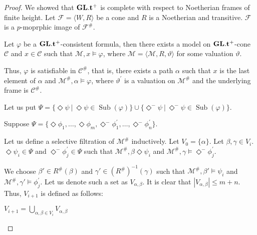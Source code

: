 \documentclass[a4paper]{article}
\theoremstyle{defin}
\theoremstyle{theorem}
\theoremstyle{prop}
\theoremstyle{lemma}
\theoremstyle{ex}
\theoremstyle{col}
\newcommand{\DiamondM}{\Diamond^{-}}
\begin{document}
\begin{proof}
  We showed that ${\bf GL}.{\bf t}^{+}$ is complete with respect to Noetherian frames of finite height. Let $\mathcal{F} = \langle W, R \rangle$ be a cone and $R$ is a Noetherian and transitive. $\mathcal{F}$ is a $p$-moprphic image of $\mathcal{F}^{\#}$.

Let $\varphi$ be a ${\bf GL}.{\bf t}^{+}$-consistent formula, then there exists a model on ${\bf GL}.{\bf t}^{+}$-cone $\mathcal{C}$ and $x \in \mathcal{C}$ such that $\mathcal{M}, x \models \varphi$, where $\mathcal{M} = \langle \mathcal{M}, R, \vartheta \rangle$ for some valuation $\vartheta$.

Thus, $\varphi$ is satisfiable in $\mathcal{C}^{\#}$, that is, there exists a path $\alpha$ such that $x$ is the last element of $\alpha$ and $\mathcal{M}^{\#}, \alpha \models \varphi$, where $\vartheta^{'}$ is a valuation on $\mathcal{M}^{\#}$ and the underlying frame is $\mathcal{C}^{\#}$.

Let us put $\Psi = \{ \Diamond \psi \: | \: \Diamond \psi \in \operatorname{Sub}(\varphi)\} \cup \{ \DiamondM \psi \: | \: \DiamondM \psi \in \operatorname{Sub}(\varphi)\}$.

Suppose $\Psi = \{ \Diamond \phi_1, \dots, \Diamond \phi_m, \DiamondM \phi^{'}_1, \dots, \DiamondM \phi^{'}_n \}$.

Let us define a selective filtration of $\mathcal{M}^{\#}$ inductively. Let $V_0 = \{ \alpha \}$. Let $\beta, \gamma \in V_i$. $\Diamond \psi_i \in \Psi$ and $\DiamondM \phi^{'}_j \in \Psi$ such that $\mathcal{M}^{\#}, \beta \Diamond \psi_i$ and $\mathcal{M}^{\#}, \gamma \models \DiamondM \phi^{'}_j$.

We choose $\beta' \in R^{\#}(\beta)$ and $\gamma' \in (R^{\#})^{-1}(\gamma)$ such that $\mathcal{M}^{\#}, \beta' \models \psi_i$ and
$\mathcal{M}^{\#}, \gamma' \models \phi^{'}_j$. Let us denote such a set as $V_{\alpha, \beta}$. It is clear that $|V_{\alpha, \beta}| \leq m + n$. Thus, $V_{i+1}$ is defined as follows:

\begin{center}
    $V_{i+1} = \bigcup \limits_{\alpha, \beta \in V_i} V_{\alpha, \beta}$
\end{center}
\end{proof}



\end{document}
